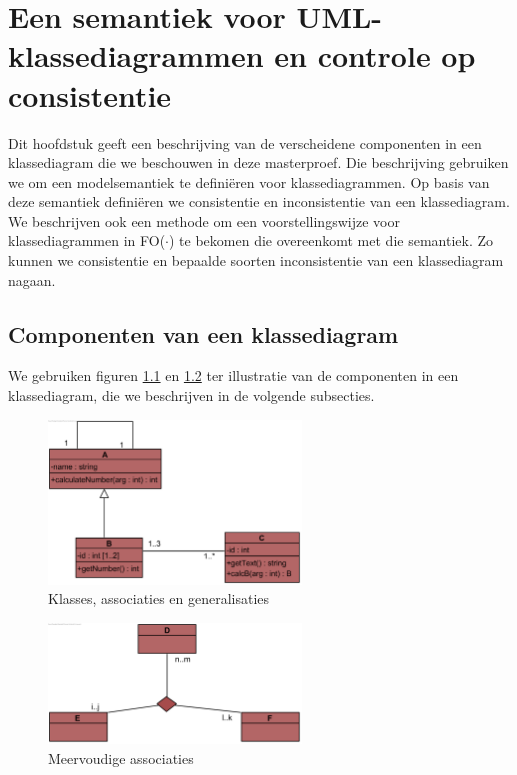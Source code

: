 \chapter{Een semantiek voor UML-klassediagrammen en controle op consistentie}\label{sec:consistentie}
Dit hoofdstuk geeft een beschrijving van de verscheidene componenten in een klassediagram die we beschouwen in deze masterproef. Die beschrijving gebruiken we om een modelsemantiek te defini\"eren voor klassediagrammen. Op basis van deze semantiek defini\"eren we consistentie en inconsistentie van een klassediagram. We beschrijven ook een methode om een voorstellingswijze voor klassediagrammen in FO($\cdot$) te bekomen die overeenkomt met die semantiek. Zo kunnen we consistentie en bepaalde soorten inconsistentie van een klassediagram nagaan.

\section{Componenten van een klassediagram}\label{sec:cd-components}

We gebruiken figuren \ref{fig:voorbeeld1} en \ref{fig:voorbeeld2} ter illustratie van de componenten in een klassediagram, die we beschrijven in de volgende subsecties.

\begin{figure}[h]
	\centering
	\includegraphics[width=0.6\textwidth]{chap-consistentie/voorbeeld1.png}
	\caption{Klasses, associaties en generalisaties}
	\label{fig:voorbeeld1}
\end{figure}

\begin{figure}[h]
	\centering
	\includegraphics[width=0.6\textwidth]{chap-consistentie/voorbeeld2.png}
	\caption{Meervoudige associaties}
	\label{fig:voorbeeld2}
\end{figure}

